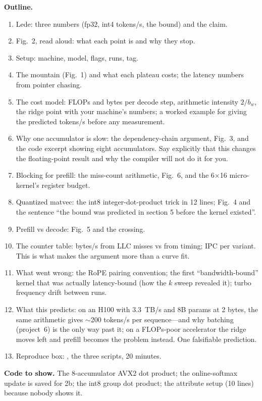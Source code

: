 \begin{blogbox}
\textbf{Outline.}
\begin{enumerate}
  \item Lede: three numbers (fp32, int4 tokens/s, the bound) and the claim.
  \item Fig.~2, read aloud: what each point is and why they stop.
  \item Setup: machine, model, flags, runs, tag.
  \item The mountain (Fig.~1) and what each plateau costs; the latency numbers from pointer chasing.
  \item The cost model: FLOPs and bytes per decode step, arithmetic intensity $2/b_w$, the ridge point with your machine's numbers; a worked example for  giving the predicted tokens/s before any measurement.
  \item Why one accumulator is slow: the dependency-chain argument, Fig.~3, and the code excerpt showing eight accumulators. Say explicitly that this changes the floating-point result and why the compiler will not do it for you.
  \item Blocking for prefill: the miss-count arithmetic, Fig.~6, and the 6$\times$16 micro-kernel's register budget.
  \item Quantized matvec: the int8 integer-dot-product trick in 12 lines; Fig.~4 and the sentence ``the bound was predicted in section 5 before the kernel existed''.
  \item Prefill vs decode: Fig.~5 and the crossing.
  \item The counter table: bytes/s from LLC misses vs from timing; IPC per variant. This is what makes the argument more than a curve fit.
  \item What went wrong: the RoPE pairing convention; the first ``bandwidth-bound'' kernel that was actually latency-bound (how the $k$ sweep revealed it); turbo frequency drift between runs.
  \item What this predicts: on an H100 with 3.3~TB/s and 8B params at 2 bytes, the same arithmetic gives $\sim$200 tokens/s per sequence---and why batching (project~6) is the only way past it; on a FLOPs-poor accelerator the ridge moves left and prefill becomes the problem instead. One falsifiable prediction.
  \item Reproduce box: , the three scripts, 20 minutes.
\end{enumerate}

\textbf{Code to show.} The 8-accumulator AVX2 dot product; the online-softmax update is saved for 2b; the int8 group dot product; the  attribute setup (10 lines) because nobody shows it.


\end{blogbox}
